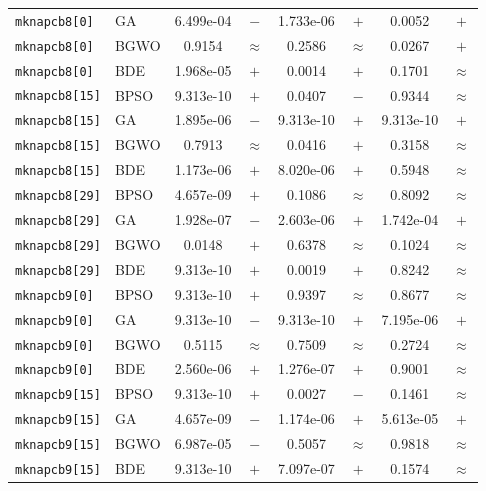 \documentclass[journal,article,submit,moreauthors]{Definitions/mdpi}
\begin{document}
\begin{longtable}{llcccccc}
    \texttt{mknapcb8[0]} & GA    & 6.499e-04 & $-$ & 1.733e-06 & $+$ &    0.0052 & $+$ \\
    \texttt{mknapcb8[0]} & BGWO  &    0.9154 & $\approx$ &    0.2586 & $\approx$ &    0.0267 & $+$ \\
    \texttt{mknapcb8[0]} & BDE   & 1.968e-05 & $+$ &    0.0014 & $+$ &    0.1701 & $\approx$ \\
    \midrule
    \texttt{mknapcb8[15]} & BPSO  & 9.313e-10 & $+$ &    0.0407 & $-$ &    0.9344 & $\approx$ \\
    \texttt{mknapcb8[15]} & GA    & 1.895e-06 & $-$ & 9.313e-10 & $+$ & 9.313e-10 & $+$ \\
    \texttt{mknapcb8[15]} & BGWO  &    0.7913 & $\approx$ &    0.0416 & $+$ &    0.3158 & $\approx$ \\
    \texttt{mknapcb8[15]} & BDE   & 1.173e-06 & $+$ & 8.020e-06 & $+$ &    0.5948 & $\approx$ \\
    \midrule
    \texttt{mknapcb8[29]} & BPSO  & 4.657e-09 & $+$ &    0.1086 & $\approx$ &    0.8092 & $\approx$ \\
    \texttt{mknapcb8[29]} & GA    & 1.928e-07 & $-$ & 2.603e-06 & $+$ & 1.742e-04 & $+$ \\
    \texttt{mknapcb8[29]} & BGWO  &    0.0148 & $+$ &    0.6378 & $\approx$ &    0.1024 & $\approx$ \\
    \texttt{mknapcb8[29]} & BDE   & 9.313e-10 & $+$ &    0.0019 & $+$ &    0.8242 & $\approx$ \\
    \midrule
    \texttt{mknapcb9[0]} & BPSO  & 9.313e-10 & $+$ &    0.9397 & $\approx$ &    0.8677 & $\approx$ \\
    \texttt{mknapcb9[0]} & GA    & 9.313e-10 & $-$ & 9.313e-10 & $+$ & 7.195e-06 & $+$ \\
    \texttt{mknapcb9[0]} & BGWO  &    0.5115 & $\approx$ &    0.7509 & $\approx$ &    0.2724 & $\approx$ \\
    \texttt{mknapcb9[0]} & BDE   & 2.560e-06 & $+$ & 1.276e-07 & $+$ &    0.9001 & $\approx$ \\
    \midrule
    \texttt{mknapcb9[15]} & BPSO  & 9.313e-10 & $+$ &    0.0027 & $-$ &    0.1461 & $\approx$ \\
    \texttt{mknapcb9[15]} & GA    & 4.657e-09 & $-$ & 1.174e-06 & $+$ & 5.613e-05 & $+$ \\
    \texttt{mknapcb9[15]} & BGWO  & 6.987e-05 & $-$ &    0.5057 & $\approx$ &    0.9818 & $\approx$ \\
    \texttt{mknapcb9[15]} & BDE   & 9.313e-10 & $+$ & 7.097e-07 & $+$ &    0.1574 & $\approx$ \\

\end{longtable}
\end{document}
